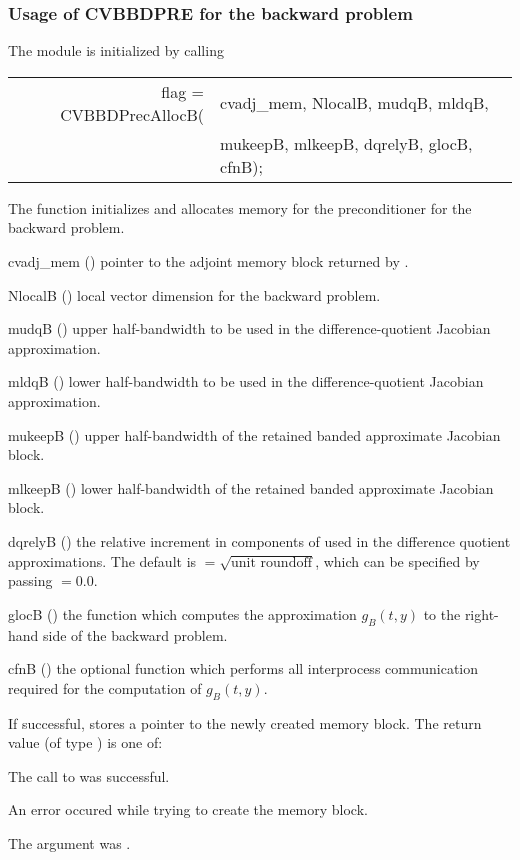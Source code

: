 \subsubsection{Usage of CVBBDPRE for the backward problem}
The {\cvbbdpre} module is initialized by calling
{
  \begin{tabular}[t]{@{}r@{}l@{}}
    flag = CVBBDPrecAllocB(&cvadj\_mem, NlocalB, mudqB, mldqB, \\
                           &mukeepB, mlkeepB, dqrelyB, glocB, cfnB);
  \end{tabular}
}
{
  The function  initializes and allocates
  memory for the {\cvbbdpre} preconditioner for the backward problem.
}
{
  \begin{args}
  \item[cvadj\_mem] ()
    pointer to the adjoint memory block returned by .
  \item[NlocalB] ()
    local vector dimension for the backward problem.
  \item[mudqB] ()
    upper half-bandwidth to be used in the difference-quotient Jacobian approximation.
  \item[mldqB] ()
    lower half-bandwidth to be used in the difference-quotient Jacobian approximation.
  \item[mukeepB] ()
    upper half-bandwidth of the retained banded approximate Jacobian block.
  \item[mlkeepB] ()
    lower half-bandwidth of the retained banded approximate Jacobian block.
  \item[dqrelyB] ()
    the relative increment in components of  used in the difference quotient
    approximations.  The default is $ = \sqrt{\text{unit roundoff}}$, which
    can be specified by passing $ = 0.0$.
  \item[glocB] ()
    the {\C} function which computes the approximation $g_B(t,y)$ to the right-hand
    side of the backward problem. 
  \item[cfnB] ()
    the optional {\C} function which performs all interprocess communication required for
    the computation of $g_B(t,y)$.
  \end{args}
}
{
  If successful,  stores a pointer to the newly created 
  {\cvbbdpre} memory block.
  The return value  (of type ) is one of:
  \begin{args}
  \item[\Id{CV\_SUCCESS}]
    The call to  was successful.
  \item[\Id{CV\_PDATA\_NULL}]
    An error occured while trying to create the {\cvbbdpre} memory block.
  \item[\Id{CV\_ADJMEM\_NULL}]
    The  argument was .
  \end{args}
}

